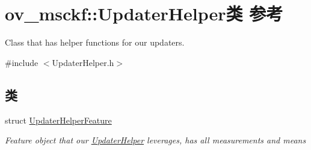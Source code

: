 \hypertarget{classov__msckf_1_1UpdaterHelper}{}\section{ov\+\_\+msckf\+:\+:Updater\+Helper类 参考}
\label{classov__msckf_1_1UpdaterHelper}


Class that has helper functions for our updaters.  




{\ttfamily \#include $<$Updater\+Helper.\+h$>$}

\subsection*{类}
\begin{DoxyCompactItemize}
\item 
struct \hyperlink{structov__msckf_1_1UpdaterHelper_1_1UpdaterHelperFeature}{Updater\+Helper\+Feature}
\begin{DoxyCompactList}\small\item\em Feature object that our \hyperlink{classov__msckf_1_1UpdaterHelper}{Updater\+Helper} leverages, has all measurements and means \end{DoxyCompactList}\end{DoxyCompactItemize}

